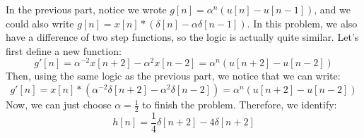 \documentclass[10pt]{article}
\begin{document}
\begin{enumerate}[label=\alph*)]
			\begin{solution}
				In the previous part, notice we wrote \( g[n] = \alpha ^{n}(u[n] - u[n - 1]) \), and we could also 
				write \( g[n] = x[n] * (\delta[n] - \alpha \delta[n - 1])\). In this problem, we also have a difference
				of two step functions, so the logic is actually quite similar. Let's first define a new 
				function: 
				\[
					g'[n] = \alpha ^{ -2} x[n + 2] - \alpha^2 x[n - 2] = \alpha ^{n}(u[n + 2] - u[n -2])
				\] 
				Then, using the same logic as the previous part, we notice that we can write:
				\[
					g'[n] = x[n] * (\alpha ^{ -2}\delta[n + 2] - \alpha^2 \delta[n -2]) = \alpha ^{n}
					(u[n + 2] - u[n -2])
				\] 
				Now, we can just choose \( \alpha = \frac{1}{2} \) to finish the problem. Therefore, we identify: 
				\[
					h[n] = \frac{1}{4}\delta[n + 2] - 4\delta[n +2]
				\] 
			\end{solution}
	\end{enumerate}
	\pagebreak
\end{document}
